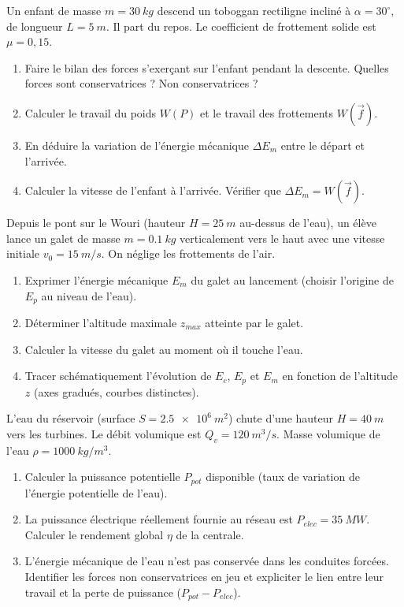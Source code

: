 \documentclass[11pt]{article}
\begin{document}
\begin{exercice}
Un enfant de masse $m = \SI{30}{kg}$ descend un toboggan rectiligne incliné à $\alpha = 30^\circ$, de longueur $L = \SI{5}{m}$. Il part du repos. Le coefficient de frottement solide est $\mu = 0,15$.
\begin{enumerate}
    \item Faire le bilan des forces s'exerçant sur l'enfant pendant la descente. Quelles forces sont conservatrices ? Non conservatrices ?
    \item Calculer le travail du poids $W(P)$ et le travail des frottements $W(\vec{f})$.
    \item En déduire la variation de l'énergie mécanique $\Delta E_m$ entre le départ et l'arrivée.
    \item Calculer la vitesse de l'enfant à l'arrivée. Vérifier que $\Delta E_m = W(\vec{f})$.
\end{enumerate}
\end{exercice}

\begin{exercice}
Depuis le pont sur le Wouri (hauteur $H = \SI{25}{m}$ au-dessus de l'eau), un élève lance un galet de masse $m = \SI{0,1}{kg}$ verticalement vers le haut avec une vitesse initiale $v_0 = \SI{15}{m/s}$. On néglige les frottements de l'air.
\begin{enumerate}
    \item Exprimer l'énergie mécanique $E_m$ du galet au lancement (choisir l'origine de $E_p$ au niveau de l'eau).
    \item Déterminer l'altitude maximale $z_{max}$ atteinte par le galet.
    \item Calculer la vitesse du galet au moment où il touche l'eau.
    \item Tracer schématiquement l'évolution de $E_c$, $E_p$ et $E_m$ en fonction de l'altitude $z$ (axes gradués, courbes distinctes).
\end{enumerate}
\end{exercice}

\begin{exercice}
L'eau du réservoir (surface $S = \SI{2,5e6}{m^2}$) chute d'une hauteur $H = \SI{40}{m}$ vers les turbines. Le débit volumique est $Q_v = \SI{120}{m^3/s}$. Masse volumique de l'eau $\rho = \SI{1000}{kg/m^3}$.
\begin{enumerate}
    \item Calculer la puissance potentielle $P_{pot}$ disponible (taux de variation de l'énergie potentielle de l'eau).
    \item La puissance électrique réellement fournie au réseau est $P_{elec} = \SI{35}{MW}$. Calculer le rendement global $\eta$ de la centrale.
    \item L'énergie mécanique de l'eau n'est pas conservée dans les conduites forcées. Identifier les forces non conservatrices en jeu et expliciter le lien entre leur travail et la perte de puissance ($P_{pot} - P_{elec}$).
\end{enumerate}
\end{exercice}
\end{document}
